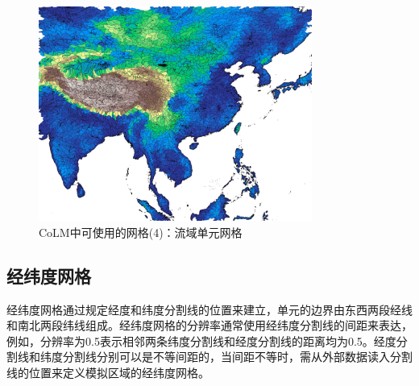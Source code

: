  {
\begin{figure}[htbp]
\centering
\includegraphics[width=0.8\textwidth]{Figures/模式构架/网格-流域.jpg}
\caption{CoLM中可使用的网格(4)：流域单元网格}
\label{fig:流域单元网格}
\end{figure}
}

\subsection{经纬度网格}\label{经纬度网格}
经纬度网格通过规定经度和纬度分割线的位置来建立，单元的边界由东西两段经线和南北两段纬线组成。经纬度网格的分辨率通常使用经纬度分割线的间距来表达，例如，分辨率为0.5\textdegree 表示相邻两条纬度分割线和经度分割线的距离均为0.5\textdegree。经度分割线和纬度分割线分别可以是不等间距的，当间距不等时，需从外部数据读入分割线的位置来定义模拟区域的经纬度网格。


